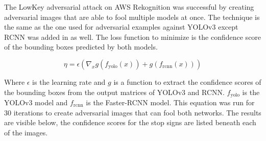 \documentclass{article}
\begin{document}
The LowKey adversarial attack \cite{cherepanova2021lowkey} on AWS Rekognition was successful by creating adversarial images that are able to fool multiple models at once. The technique is the same as the one used for adversarial examples against YOLOv3 except RCNN was added in as well. The loss function to minimize is the confidence score of the bounding boxes predicted by both models.

\begin{equation}
    \eta = \epsilon (\nabla_x g(f_{\text{yolo}}(x)) + g(f_{\text{rcnn}}(x)))
\end{equation}

Where $\epsilon$ is the learning rate and $g$ is a function to extract the confidence scores of the bounding boxes from the output matrices of YOLOv3 and RCNN. $f_{\text{yolo}}$ is the YOLOv3 model and $f_{\text{rcnn}}$ is the Faster-RCNN model. This equation was run for 30 iterations to create adversarial images that can fool both networks. The results are visible below, the confidence scores for the stop signs are listed beneath each of the images.
\end{document}
